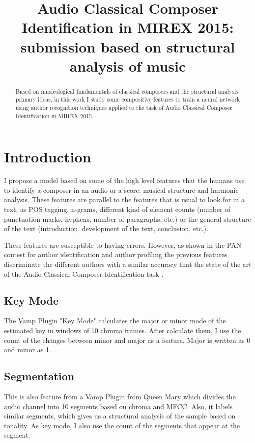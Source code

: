 \documentclass{article}
\title{Audio Classical Composer Identification in MIREX 2015: submission based on structural analysis of music}
\begin{document}
%
\maketitle
%
\begin{abstract}
Based on musicological fundamentals of classical composers and the structural analysis primary ideas, in this work I study some compositive features to train a neural network using author recognition techniques applied to the task of Audio Classical Composer Identification in MIREX 2015. 
\end{abstract}
%


\section{Introduction}\label{sec:introduction}

I propose a model based on some of the high level features that the humans use to identify a composer in an audio or a score: musical structure and harmonic analysis.  These features are parallel to the features that is usual to look for in a text, as POS tagging, n-grams, different kind of element counts (number of punctuation marks, hyphens, number of paragraphs, etc.) or the general structure of the text (introduction, development of the text, conclusion, etc.).

These features are susceptible to having errors. However, as shown in the PAN contest for author identification \cite{pan14id} and author profiling \cite{pan13pr} the previous features discriminate the different authors with a similar accuracy that the state of the art of the Audio Classical Composer Identification task \cite{mirex14res}.



\subsection{Key Mode}\label{subsec:keymode}
The Vamp Plugin "Key Mode" calculates the major or minor mode of the estimated key in windows of 10 chroma frames. After calculate them, I use the count of the changes between minor and major as a feature. Major is written as 0 and minor as 1.

\subsection{Segmentation}\label{subsec:segmentation}
This is also feature from a Vamp Plugin from Queen Mary which divides the audio channel into 10  segments based on chroma and MFCC. Also, it labels similar segments, which gives us a structural analysis of the sample based on tonality. As key mode, I also use the count of the segments that appear at the segment.
\end{document}
